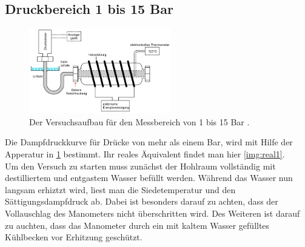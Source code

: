 \subsection{Druckbereich 1 bis 15 Bar}
\begin{figure}[H]
    \centering
    \includegraphics[width=0.55\textwidth]{images/Abbildung4.PNG}
    \caption{Der Versuchsaufbau für den Messbereich von 1 bis 15 Bar \protect \cite{V203}.}
    \label{img:aufbau2}
\end{figure}
Die Dampfdruckkurve für Drücke von mehr als einem Bar, wird mit Hilfe  der Apperatur in \ref{img:aufbau2} bestimmt. Ihr reales Äquivalent findet man hier \ref{img:real1}.\\
Um den Versuch zu starten muss zunächst der Hohlraum vollständig mit destilliertem und entgastem Wasser befüllt werden.
Während das Wasser nun langsam erhiztzt wird, liest man die Siedetemperatur und den Sättigungsdampfdruck ab. Dabei ist besonders darauf zu 
achten, dass der Vollauschlag des Manometers nicht überschritten wird. Des Weiteren ist darauf zu auchten, dass das Manometer durch ein mit kaltem Wasser gefülltes 
Kühlbecken vor Erhitzung geschützt.